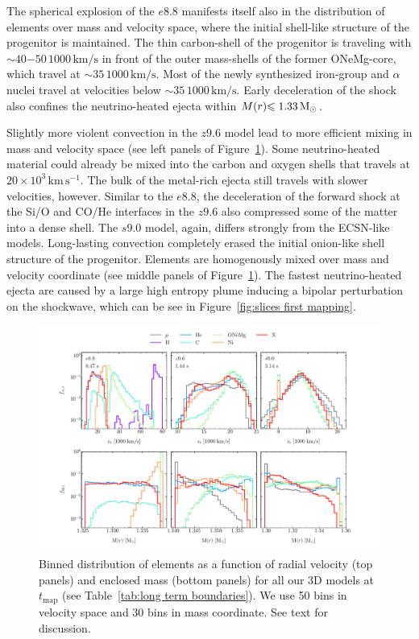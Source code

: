 \documentclass[fleqn,usenatbib]{mnras}
\newcommand{\solm}{\ensuremath{\rm{M_{\odot}}}\xspace}
\newcommand{\kms}{\ensuremath{\mathrm{km\, s^{-1}}}}
\begin{document}
The spherical explosion of the $e8.8$ manifests itself also in the distribution of elements over mass and velocity space, where the initial shell-like structure of the progenitor is maintained.
The thin carbon-shell of the progenitor is traveling with $\sim 40\mathord{-}50\,\mathrm{1000\,km/s}$ in front of the outer mass-shells of the former ONeMg-core, which travel at $\sim 35\,\mathrm{1000\,km/s}$. Most of the newly synthesized iron-group and $\alpha$ nuclei travel at velocities below $\sim 35\,\mathrm{1000\,km/s}$.
Early deceleration of the shock also confines the neutrino-heated ejecta within $M(r)\mathord{\le 1.33}\,\solm$.

Slightly more violent convection in the $z9.6$ model lead to more efficient mixing in mass and velocity space (see left panels of Figure~\ref{fig:mdp first mapping}). Some neutrino-heated material could already be mixed into the carbon and oxygen shells that travels at $20\times 10^3\,\kms$. The bulk of the metal-rich ejecta still travels with slower velocities, however. 
Similar to the $e8.8$, the deceleration of the forward shock at the Si/O and CO/He interfaces in the $z9.6$ also compressed some of the matter into a dense shell. 
The $s9.0$ model, again, differs strongly from the ECSN-like models. 
Long-lasting convection completely erased the initial onion-like shell structure of the progenitor. Elements are homogenously mixed over mass and velocity coordinate (see middle panels of Figure~\ref{fig:mdp first mapping}).
The fastest neutrino-heated ejecta are caused by a large high entropy plume inducing a bipolar perturbation on the shockwave, which can be see in Figure~\ref{fig:slices first mapping}.

\begin{figure}
 \centering
 \includegraphics[width=\textwidth,trim=1.1cm 0.6cm 1cm 0cm,clip]{pic/z96_s9_e8_3d_massDis_mvr_and_masstime_0_paper.pdf}
 \caption{Binned distribution of elements as a function of radial velocity (top panels) and enclosed mass (bottom panels) for all our 3D models at $t_{\mathrm{map}}$ (see Table~\ref{tab:long term boundaries}). We use 50 bins in velocity space and 30 bins in mass coordinate. See text for discussion.}
 \label{fig:mdp first mapping}
\end{figure}
\end{document}
